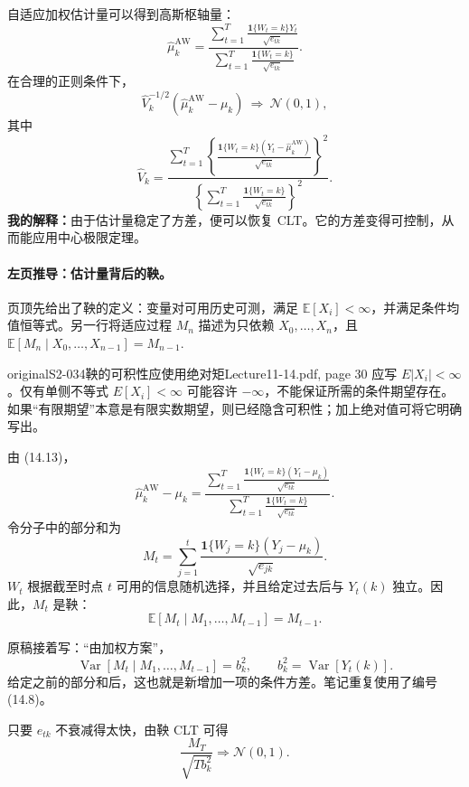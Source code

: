 自适应加权估计量可以得到高斯枢轴量：
\[
 \widehat\mu_k^{\mathrm{AW}}
 =\frac{\displaystyle\sum_{t=1}^T
 \frac{\mathbf1\{W_t=k\}Y_t}{\sqrt{e_{tk}}}}
 {\displaystyle\sum_{t=1}^T
 \frac{\mathbf1\{W_t=k\}}{\sqrt{e_{tk}}}}.\tag{14.13}
\]
在合理的正则条件下，
\[
 \widehat V_k^{-1/2}(\widehat\mu_k^{\mathrm{AW}}-\mu_k)
 \ \Rightarrow\ \mathcal N(0,1),
\]
其中
\[
 \widehat V_k=
 \frac{\displaystyle\sum_{t=1}^T
 \left\{\frac{\mathbf1\{W_t=k\}(Y_t-\widehat\mu_k^{\mathrm{AW}})}
 {\sqrt{e_{tk}}}\right\}^{\!2}}
 {\displaystyle\left\{\sum_{t=1}^T
 \frac{\mathbf1\{W_t=k\}}{\sqrt{e_{tk}}}\right\}^{\!2}}.\tag{14.14}
\]
\textbf{我的解释：}由于估计量稳定了方差，便可以恢复 CLT。它的方差变得可控制，从而能应用中心极限定理。

\paragraph{左页推导：估计量背后的鞅。}
页顶先给出了鞅的定义：变量对可用历史可测，满足 $\mathbb E[X_i]<\infty$，并满足条件均值恒等式。另一行将适应过程 $M_n$ 描述为只依赖 $X_0,\ldots,X_n$，且
$\mathbb E[M_n\mid X_0,\ldots,X_{n-1}]=M_{n-1}$.

\begin{reviewnote}{original}{S2-034}{鞅的可积性应使用绝对矩}{Lecture11-14.pdf, page 30}
应写 $E|X_i|<\infty$。仅有单侧不等式 $E[X_i]<\infty$ 可能容许 $-\infty$，不能保证所需的条件期望存在。如果“有限期望”本意是有限实数期望，则已经隐含可积性；加上绝对值可将它明确写出。
\end{reviewnote}


由 (14.13)，
\[
 \widehat\mu_k^{\mathrm{AW}}-\mu_k
 =\frac{\displaystyle\sum_{t=1}^T
 \frac{\mathbf1\{W_t=k\}(Y_t-\mu_k)}{\sqrt{e_{tk}}}}
 {\displaystyle\sum_{t=1}^T
 \frac{\mathbf1\{W_t=k\}}{\sqrt{e_{tk}}}}.
\]
令分子中的部分和为
\[
 M_t=\sum_{j=1}^t
 \frac{\mathbf1\{W_j=k\}(Y_j-\mu_k)}{\sqrt{e_{jk}}}.
\]
$W_t$ 根据截至时点 $t$ 可用的信息随机选择，并且给定过去后与 $Y_t(k)$ 独立。因此，$M_t$ 是鞅：
\[
 \mathbb E[M_t\mid M_1,\ldots,M_{t-1}]=M_{t-1}.
\]

原稿接着写：“由加权方案”，
\[
 \operatorname{Var}[M_t\mid M_1,\ldots,M_{t-1}]=b_k^2,
 \qquad b_k^2=\operatorname{Var}[Y_t(k)].\tag{14.8，原稿标号}
\]
给定之前的部分和后，这也就是新增加一项的条件方差。笔记重复使用了编号 (14.8)。

只要 $e_{tk}$ 不衰减得太快，由鞅 CLT 可得
\[
 \frac{M_T}{\sqrt{Tb_k^2}}\Rightarrow\mathcal N(0,1).
\]

